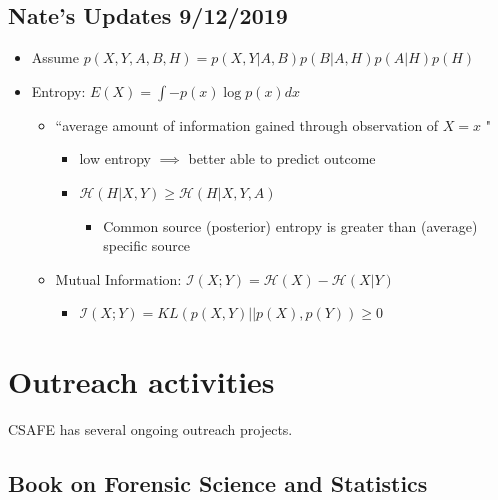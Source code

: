 \documentclass[]{book}
\providecommand{\tightlist}{%
  \setlength{\itemsep}{0pt}\setlength{\parskip}{0pt}}
\begin{document}
\hypertarget{nates-updates-9122019}{%
\section{Nate's Updates 9/12/2019}\label{nates-updates-9122019}}

\begin{itemize}
\tightlist
\item
  Assume \(p(X,Y,A,B,H) = p(X,Y|A,B)p(B|A,H)p(A|H)p(H)\)
\item
  Entropy: \(E(X) = \int -p(x)\log p(x) dx\)

  \begin{itemize}
  \tightlist
  \item
    ``average amount of information gained through observation of \(X = x\) "

    \begin{itemize}
    \tightlist
    \item
      low entropy \(\implies\) better able to predict outcome
    \item
      \(\mathcal{H}(H|X,Y) \geq \mathcal{H}(H|X,Y,A)\)

      \begin{itemize}
      \tightlist
      \item
        Common source (posterior) entropy is greater than (average) specific source
      \end{itemize}
    \end{itemize}
  \item
    Mutual Information: \(\mathcal{I}(X;Y) = \mathcal{H}(X) - \mathcal{H}(X|Y)\)

    \begin{itemize}
    \tightlist
    \item
      \(\mathcal{I}(X;Y) = KL(p(X,Y)||p(X),p(Y)) \geq 0\)
    \end{itemize}
  \end{itemize}
\end{itemize}

\hypertarget{outreach-activities}{%
\chapter{Outreach activities}\label{outreach-activities}}

CSAFE has several ongoing outreach projects.

\hypertarget{book-on-forensic-science-and-statistics}{%
\section{Book on Forensic Science and Statistics}\label{book-on-forensic-science-and-statistics}}
\end{document}
